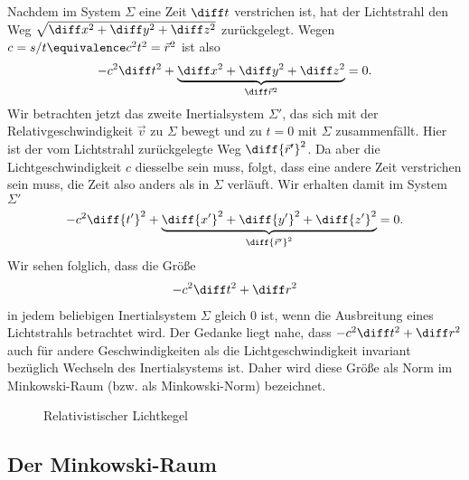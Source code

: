 Nachdem im System $\Sigma$ eine Zeit $\diff t$ verstrichen ist, hat der Lichtstrahl den Weg $\sqrt{\diff x^2+\diff y^2+\diff z^2}$ zurückgelegt.
Wegen $c=s/t\equivalence c^2 t^2 = \vec r^2$ ist also
\begin{align*}
    -c^2 \diff t^2+\underbrace{\diff x^2+\diff y^2+\diff z^2}_{\diff\vec r^2}=0.
\end{align*}
Wir betrachten jetzt das zweite Inertialsystem $\Sigma'$, das sich mit der Relativgeschwindigkeit $\vec v$ zu $\Sigma$ bewegt und zu $t=0$ mit $\Sigma$ zusammenfällt.
Hier ist der vom Lichtstrahl zurückgelegte Weg $\diff{\vec r'}^2$.
Da aber die Lichtgeschwindigkeit $c$ diesselbe sein muss, folgt, dass eine andere Zeit verstrichen sein muss, die Zeit also anders als in $\Sigma$ verläuft.
Wir erhalten damit im System $\Sigma'$
\begin{align*}
    -c^2 \diff{t'}^2+\underbrace{\diff{x'}^2+\diff{y'}^2+\diff{z'}^2}_{\diff{\vec r'}^2}=0.
\end{align*}
Wir sehen folglich, dass die Größe
\begin{align*}
    -c^2\diff t^2+\diff r^2
\end{align*}
in jedem beliebigen Inertialsystem $\Sigma$ gleich $0$ ist, wenn die Ausbreitung eines Lichtstrahls betrachtet wird.
Der Gedanke liegt nahe, dass $-c^2\diff t^2+\diff r^2$ auch für andere Geschwindigkeiten als die Lichtgeschwindigkeit invariant bezüglich Wechseln des Inertialsystems ist.
Daher wird diese Größe als Norm im Minkowski-Raum (bzw. als Minkowski-Norm) bezeichnet.


\begin{figure}[htb]
    \centering
    \tfigSRTLichtkegel
    \caption{Relativistischer Lichtkegel}
    \label{fig:srt_lichtkegel}
\end{figure}


\subsection{Der Minkowski-Raum}


